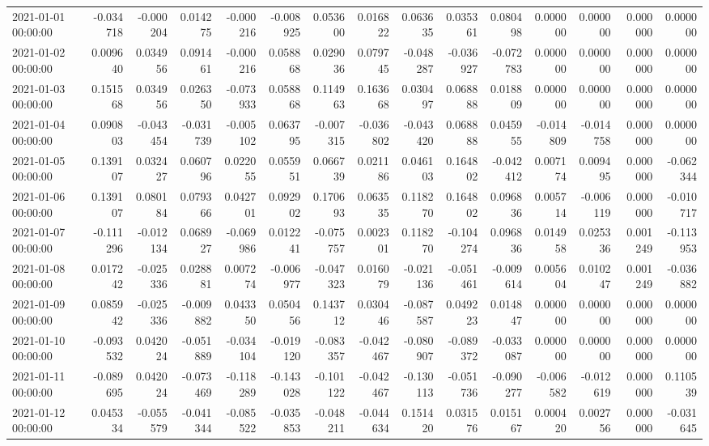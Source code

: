 \begin{tabular}{lrrrrrrrrrrrrrr}
2021-01-01 00:00:00 & -0.034718 & -0.000204 & 0.014275 & -0.000216 & -0.008925 & 0.053600 & 0.016822 & 0.063635 & 0.035361 & 0.080498 & 0.000000 & 0.000000 & 0.000000 & 0.000000 \\
2021-01-02 00:00:00 & 0.009640 & 0.034956 & 0.091461 & -0.000216 & 0.058868 & 0.029036 & 0.079745 & -0.048287 & -0.036927 & -0.072783 & 0.000000 & 0.000000 & 0.000000 & 0.000000 \\
2021-01-03 00:00:00 & 0.151568 & 0.034956 & 0.026350 & -0.073933 & 0.058868 & 0.114963 & 0.163668 & 0.030497 & 0.068888 & 0.018809 & 0.000000 & 0.000000 & 0.000000 & 0.000000 \\
2021-01-04 00:00:00 & 0.090803 & -0.043454 & -0.031739 & -0.005102 & 0.063795 & -0.007315 & -0.036802 & -0.043420 & 0.068888 & 0.045955 & -0.014809 & -0.014758 & 0.000000 & 0.000000 \\
2021-01-05 00:00:00 & 0.139107 & 0.032427 & 0.060796 & 0.022055 & 0.055951 & 0.066739 & 0.021186 & 0.046103 & 0.164802 & -0.042412 & 0.007174 & 0.009495 & 0.000000 & -0.062344 \\
2021-01-06 00:00:00 & 0.139107 & 0.080184 & 0.079366 & 0.042701 & 0.092902 & 0.170693 & 0.063535 & 0.118270 & 0.164802 & 0.096836 & 0.005714 & -0.006119 & 0.000000 & -0.010717 \\
2021-01-07 00:00:00 & -0.111296 & -0.012134 & 0.068927 & -0.069986 & 0.012241 & -0.075757 & 0.002301 & 0.118270 & -0.104274 & 0.096836 & 0.014958 & 0.025336 & 0.001249 & -0.113953 \\
2021-01-08 00:00:00 & 0.017242 & -0.025336 & 0.028881 & 0.007274 & -0.006977 & -0.047323 & 0.016079 & -0.021136 & -0.051461 & -0.009614 & 0.005604 & 0.010247 & 0.001249 & -0.036882 \\
2021-01-09 00:00:00 & 0.085942 & -0.025336 & -0.009882 & 0.043350 & 0.050456 & 0.143712 & 0.030446 & -0.087587 & 0.049223 & 0.014847 & 0.000000 & 0.000000 & 0.000000 & 0.000000 \\
2021-01-10 00:00:00 & -0.093532 & 0.042024 & -0.051889 & -0.034104 & -0.019120 & -0.083357 & -0.042467 & -0.080907 & -0.089372 & -0.033087 & 0.000000 & 0.000000 & 0.000000 & 0.000000 \\
2021-01-11 00:00:00 & -0.089695 & 0.042024 & -0.073469 & -0.118289 & -0.143028 & -0.101122 & -0.042467 & -0.130113 & -0.051736 & -0.090277 & -0.006582 & -0.012619 & 0.000000 & 0.110539 \\
2021-01-12 00:00:00 & 0.045334 & -0.055579 & -0.041344 & -0.085522 & -0.035853 & -0.048211 & -0.044634 & 0.151420 & 0.031576 & 0.015167 & 0.000420 & 0.002756 & 0.000000 & -0.031645 \\

\end{tabular}

